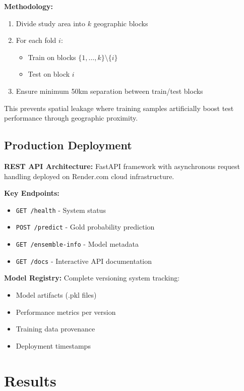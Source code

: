 \documentclass[12pt,a4paper]{article}
\begin{document}
\textbf{Methodology:}
\begin{enumerate}
    \item Divide study area into $k$ geographic blocks
    \item For each fold $i$:
    \begin{itemize}
        \item Train on blocks $\{1, \ldots, k\} \setminus \{i\}$
        \item Test on block $i$
    \end{itemize}
    \item Ensure minimum 50km separation between train/test blocks
\end{enumerate}

This prevents spatial leakage where training samples artificially boost test performance through geographic proximity.

\subsection{Production Deployment}

\textbf{REST API Architecture:} FastAPI framework with asynchronous request handling deployed on Render.com cloud infrastructure.

\textbf{Key Endpoints:}
\begin{itemize}
    \item \texttt{GET /health} - System status
    \item \texttt{POST /predict} - Gold probability prediction
    \item \texttt{GET /ensemble-info} - Model metadata
    \item \texttt{GET /docs} - Interactive API documentation
\end{itemize}

\textbf{Model Registry:} Complete versioning system tracking:
\begin{itemize}
    \item Model artifacts (.pkl files)
    \item Performance metrics per version
    \item Training data provenance
    \item Deployment timestamps
\end{itemize}

\section{Results}
\end{document}
